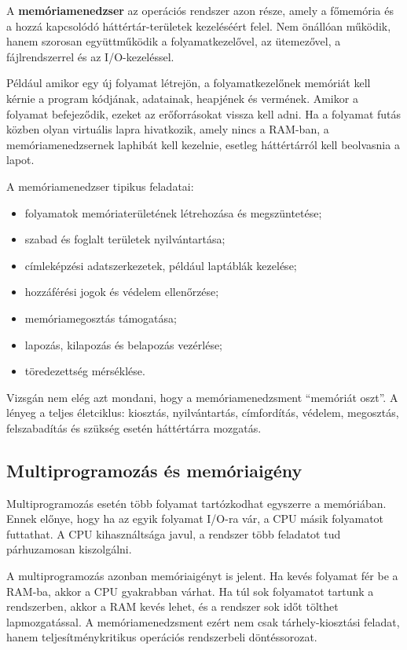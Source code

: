 A \textbf{memóriamenedzser} az operációs rendszer azon része, amely a főmemória és a hozzá kapcsolódó háttértár-területek kezeléséért felel. Nem önállóan működik, hanem szorosan együttműködik a folyamatkezelővel, az ütemezővel, a fájlrendszerrel és az I/O-kezeléssel.

Például amikor egy új folyamat létrejön, a folyamatkezelőnek memóriát kell kérnie a program kódjának, adatainak, heapjének és vermének. Amikor a folyamat befejeződik, ezeket az erőforrásokat vissza kell adni. Ha a folyamat futás közben olyan virtuális lapra hivatkozik, amely nincs a RAM-ban, a memóriamenedzsernek laphibát kell kezelnie, esetleg háttértárról kell beolvasnia a lapot.

A memóriamenedzser tipikus feladatai:

\begin{itemize}
  \item folyamatok memóriaterületének létrehozása és megszüntetése;
  \item szabad és foglalt területek nyilvántartása;
  \item címleképzési adatszerkezetek, például laptáblák kezelése;
  \item hozzáférési jogok és védelem ellenőrzése;
  \item memóriamegosztás támogatása;
  \item lapozás, kilapozás és belapozás vezérlése;
  \item töredezettség mérséklése.
\end{itemize}

\begin{warningbox}
Vizsgán nem elég azt mondani, hogy a memóriamenedzsment ``memóriát oszt''. A lényeg a teljes életciklus: kiosztás, nyilvántartás, címfordítás, védelem, megosztás, felszabadítás és szükség esetén háttértárra mozgatás.
\end{warningbox}

\subsection{Multiprogramozás és memóriaigény}

Multiprogramozás esetén több folyamat tartózkodhat egyszerre a memóriában. Ennek előnye, hogy ha az egyik folyamat I/O-ra vár, a CPU másik folyamatot futtathat. A CPU kihasználtsága javul, a rendszer több feladatot tud párhuzamosan kiszolgálni.

A multiprogramozás azonban memóriaigényt is jelent. Ha kevés folyamat fér be a RAM-ba, akkor a CPU gyakrabban várhat. Ha túl sok folyamatot tartunk a rendszerben, akkor a RAM kevés lehet, és a rendszer sok időt tölthet lapmozgatással. A memóriamenedzsment ezért nem csak tárhely-kiosztási feladat, hanem teljesítménykritikus operációs rendszerbeli döntéssorozat.

